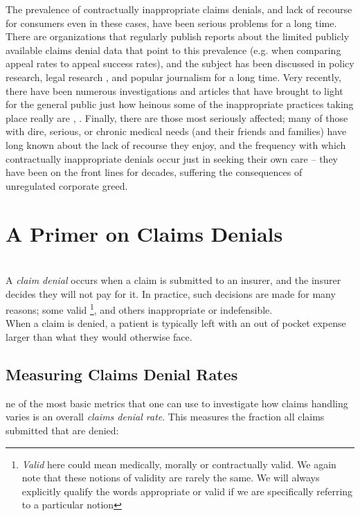 \documentclass[12pt, a4paper]{report}
\begin{document}
The prevalence of contractually inappropriate claims denials, and lack of recourse for consumers even in these cases, have been serious problems for a long time. There are organizations that regularly publish reports \cite{pollitz2021} about the limited publicly available claims denial data that point to this prevalence (e.g. when comparing appeal rates to appeal success rates), and the subject has been discussed in policy research, legal research \cite{fox2022}, and popular journalism \cite{konrad2010} for a long time. Very recently, there have been numerous investigations and articles that have brought to light for the general public just how heinous some of the inappropriate practices taking place really are \cite{armstrong2023a}, \cite{armstrong2023b}. Finally, there are those most seriously affected; many of those with dire, serious, or chronic medical needs (and their friends and families) have long known about the lack of recourse they enjoy, and the frequency with which contractually inappropriate denials occur just in seeking their own care -- they have been on the front lines for decades, suffering the consequences of unregulated corporate greed.\\
	
\section{A Primer on Claims Denials}
\hfill\\

\indent A \emph{claim denial} occurs when a claim is submitted to an insurer, and the insurer decides they will not pay for it. In practice, such decisions are made for many reasons; some valid \footnote{\emph{Valid} here could mean medically, morally or contractually valid. We again note that these notions of validity are rarely the same. We will always explicitly qualify the words appropriate or valid if we are specifically referring to a particular notion}, and others inappropriate or indefensible.\\

When a claim is denied, a patient is typically left with an out of pocket expense larger than what they would otherwise face.

\subsection{Measuring Claims Denial Rates}

ne of the most basic metrics that one can use to investigate how claims handling varies is an overall \emph{claims denial rate}. This measures the fraction all claims submitted that are denied:
\end{document}
